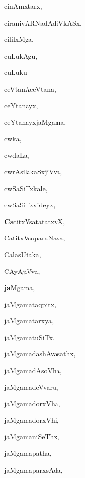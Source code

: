 \begin{multicols}{3}
{\noindent
{cinAmxtarx}, \pageref{cinAmxtarx}

\noindent
{ciranivARNadAdiVkASx}, \pageref{ciranivARNadAdiVkASx}

\noindent
{cililxMga}, \pageref{cililxMga}

\noindent
{cuLukAgu}, \pageref{cuLukAgu}

\noindent
{cuLuku}, \pageref{cuLuku}

\noindent
{ceVtanAceVtana}, \pageref{ceVtanAceVtana}

\noindent
{ceYtanayx}, \pageref{ceYtanayx}

\noindent
{ceYtanayxjaMgama}, \pageref{ceYtanayxjaMgama}

\noindent
{cwka}, \pageref{cwka}

\noindent
{cwdaLa}, \pageref{cwdaLa}

\noindent
{cwrAsilakaSxjiVva}, \pageref{cwrAsilakaSxjiVva}

\noindent
{cwSaSiTxkale}, \pageref{cwSaSiTxkale}

\noindent
{cwSaSiTxvideyx}, \pageref{cwSaSiTxvideyx}

\noindent
{{\large\textbf{Ca}}titxVsatatatxvX}, \pageref{CatitxVsatatatxvX}

\noindent
{CatitxVsaparxNava}, \pageref{CatitxVsaparxNava}

\noindent
{CalasUtaka}, \pageref{CalasUtaka}

\noindent
{CAyAjiVva}, \pageref{CAyAjiVva}

\noindent
{{\large\textbf{ja}}Mgama}, \pageref{jaMgama}

\noindent
{jaMgamataqpitx}, \pageref{jaMgamataqpitx}

\noindent
{jaMgamatarxya}, \pageref{jaMgamatarxya}

\noindent
{jaMgamatuSiTx}, \pageref{jaMgamatuSiTx}

\noindent
{jaMgamadashAvasathx}, \pageref{jaMgamadashAvasathx}

\noindent
{jaMgamadAsoVha}, \pageref{jaMgamadAsoVha}

\noindent
{jaMgamadeVvaru}, \pageref{jaMgamadeVvaru}

\noindent
{jaMgamadorxVha}, \pageref{jaMgamadorxVha}

\noindent
{jaMgamadorxVhi}, \pageref{jaMgamadorxVhi}

\noindent
{jaMgamaniSeThx}, \pageref{jaMgamaniSeThx}

\noindent
{jaMgamapatha}, \pageref{jaMgamapatha}

\noindent
{jaMgamaparxsAda}, \pageref{jaMgamaparxsAda}

}
\end{multicols}
